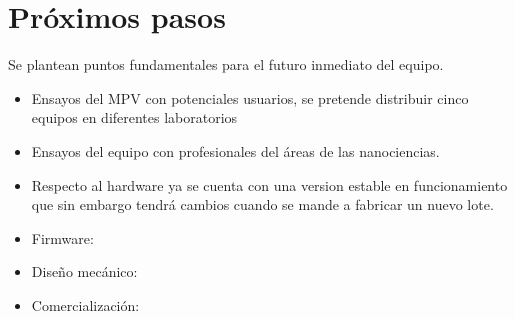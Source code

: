 \section{Próximos pasos}

Se plantean puntos fundamentales para el futuro inmediato del equipo.  

\begin{itemize}

\item Ensayos del MPV con potenciales usuarios, se pretende distribuir cinco equipos en diferentes laboratorios 
\item Ensayos del equipo con profesionales del áreas de las nanociencias.
\item Respecto al hardware ya se cuenta con una version estable en funcionamiento que sin embargo tendrá cambios cuando se mande a fabricar un nuevo lote. 
\item Firmware:
\item Diseño mecánico:
\item Comercialización:
\end{itemize}


